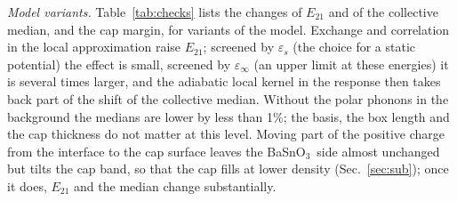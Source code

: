 \documentclass[11pt]{article}
\newcommand{\BSO}{\texorpdfstring{BaSnO$_3$}{BaSnO3}}
\begin{document}
\emph{Model variants.} Table~\ref{tab:checks} lists the changes of $E_{21}$ and of the collective median, and the cap margin, for variants of the model. Exchange and correlation in the local approximation raise $E_{21}$; screened by $\varepsilon_s$ (the choice for a static potential) the effect is small, screened by $\varepsilon_\infty$ (an upper limit at these energies) it is several times larger, and the adiabatic local kernel in the response then takes back part of the shift of the collective median. Without the polar phonons in the background the medians are lower by less than 1\%; the basis, the box length and the cap thickness do not matter at this level. Moving part of the positive charge from the interface to the cap surface leaves the \BSO\ side almost unchanged but tilts the cap band, so that the cap fills at lower density (Sec.~\ref{sec:sub}); once it does, $E_{21}$ and the median change substantially.
\end{document}
